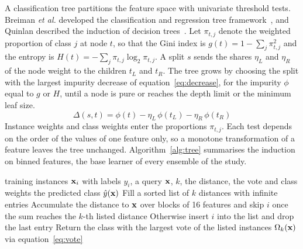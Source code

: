 \documentclass[10pt,conference]{IEEEtran}
\begin{document}
A classification tree partitions the feature space with univariate threshold tests. Breiman \textit{et al.} developed the classification and regression tree framework~\cite{breiman1984a}, and Quinlan described the induction of decision trees~\cite{quinlan1986}. Let $\pi_{t,j}$ denote the weighted proportion of class $j$ at node $t$, so that the Gini index is $g(t) = 1 - \sum_{j} \pi_{t,j}^{2}$ and the entropy is $H(t) = -\sum_{j} \pi_{t,j} \log_2 \pi_{t,j}$. A split $s$ sends the shares $\eta_L$ and $\eta_R$ of the node weight to the children $t_L$ and $t_R$. The tree grows by choosing the split with the largest impurity decrease of equation~\eqref{eq:decrease}, for the impurity $\phi$ equal to $g$ or $H$, until a node is pure or reaches the depth limit or the minimum leaf size.
\begin{equation}
\label{eq:decrease}
\Delta(s, t) = \phi(t) - \eta_L \, \phi(t_L) - \eta_R \, \phi(t_R)
\end{equation}
Instance weights and class weights enter the proportions $\pi_{t,j}$. Each test depends on the order of the values of one feature only, so a monotone transformation of a feature leaves the tree unchanged. Algorithm~\ref{alg:tree} summarises the induction on binned features, the base learner of every ensemble of the study.

\begin{algorithm}[b]
\caption{Prediction of k-nearest neighbours}
\label{alg:knn}
\begin{algorithmic}[1]
\Require training instances $\mathbf{x}_i$ with labels $y_i$, a query $\mathbf{x}$, $k$, the distance, the vote and class weights
\Ensure the predicted class $\hat{y}(\mathbf{x})$
\State Fill a sorted list of $k$ distances with infinite entries
    \State Accumulate the distance to $\mathbf{x}$ over blocks of 16 features and skip $i$ once the sum reaches the $k$-th listed distance
    \State Otherwise insert $i$ into the list and drop the last entry
\EndFor
\State Return the class with the largest vote of the listed instances $\Omega_k(\mathbf{x})$ via equation~\eqref{eq:vote}
\end{algorithmic}
\end{algorithm}
\end{document}
